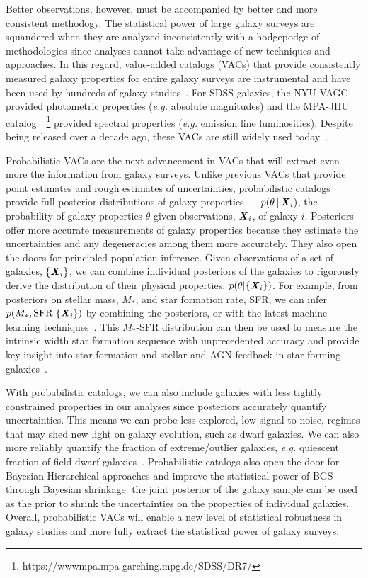 Better observations, however, must be accompanied by better and more consistent
methodogy. 
The statistical power of large galaxy surveys are squandered when they are
analyzed inconsistently with a hodgepodge of methodologies since analyses
cannot take advantage of new techniques and approaches. 
In this regard, value-added catalogs (VACs) that provide consistently measured
galaxy properties for entire galaxy surveys are instrumental and have been
used by hundreds of galaxy studies~\citep[see][for a review]{blanton2009}.
For SDSS galaxies, the NYU-VAGC~\citep{blanton2005} provided photometric
properties (\emph{e.g.} absolute magnitudes) and the MPA-JHU
catalog~~\citep{brinchmann2004}\footnote{https://wwwmpa.mpa-garching.mpg.de/SDSS/DR7/}
provided spectral properties (\emph{e.g.} emission line luminosities).
Despite being released over a decade ago, these VACs are still widely used
today~\citep[\emph{e.g.}][]{alpaslan2021, odonnell2021, trevisan2021}. 

Probabilistic VACs are the next advancement in VACs that will extract even more
the information from galaxy surveys. 
Unlike previous VACs that provide point estimates and rough estimates of
uncertainties, probabilistic catalogs provide full posterior distributions of
galaxy properties --- $p(\theta\,|\,{\textbf{\textit{X}}_i})$, the probability of galaxy
properties $\theta$ given observations, ${\textbf{\textit{X}}_i}$, of galaxy $i$.
Posteriors offer more accurate measurements of galaxy properties because they
estimate the uncertainties and any degeneracies among them more accurately. 
They also open the doors for principled population inference.
Given observations of a set of galaxies, $\{{\textbf{\textit{X}}_i}\}$, we can combine
individual posteriors of the galaxies to rigorously derive the distribution of
their physical properties: $p(\theta | \{ {\textbf{\textit{X}}_i} \})$.
For example, from posteriors on stellar mass, $M_*$, and star formation
rate, SFR, we can infer $p(M_*, {\rm SFR} | \{ {\textbf{\textit{X}}_i} \})$ by combining the
posteriors, or with the latest machine learning techniques~\citep{leja2021}.
This $M_*$-SFR distribution can then be used to measure the intrinsic width
star formation sequence with unprecedented accuracy and provide key insight
into star formation and stellar and AGN feedback in star-forming
galaxies~\citep[\emph{e.g.}][]{davies2021}.

With probabilistic catalogs, we can also include galaxies with less
tightly constrained properties in our analyses since posteriors accurately
quantify uncertainties. 
This means we can probe less explored, low signal-to-noise, regimes that may
shed new light on galaxy evolution, such as dwarf galaxies.
We can also more reliably quantify the fraction of extreme/outlier
galaxies, \emph{e.g.} quiescent fraction of field dwarf
galaxies~\citep{geha2012}.
Probabilistic catalogs also open the door for Bayesian Hierarchical approaches
and improve the statistical power of BGS through Bayesian shrinkage: the joint
posterior of the galaxy sample can be used as the prior to shrink the
uncertainties on the properties of individual galaxies. 
Overall, probabilistic VACs will enable a new level of statistical robustness
in galaxy studies and more fully extract the statistical power of galaxy surveys.

